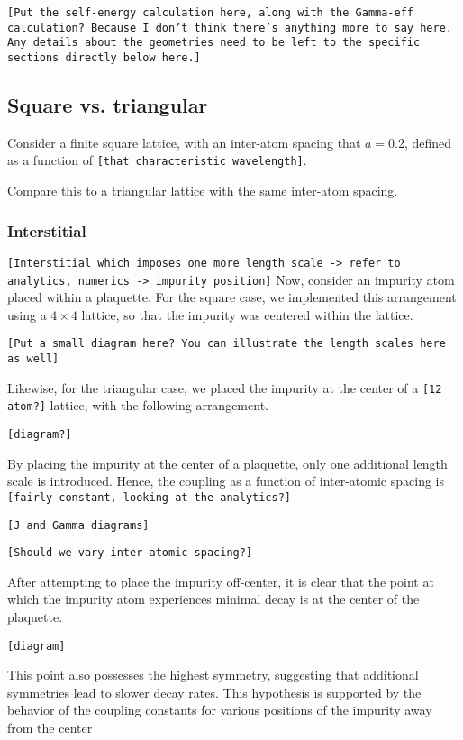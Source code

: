 \documentclass[aps,pra,superscriptaddress,twocolumn]{revtex4-1}
\newcommand{\commentSB}[1]{\texttt{\color{blue}[#1]}}
\newcommand{\commentSO}[1]{\texttt{\color{orange}[#1]}}
\begin{document}
\commentSB{Put the self-energy calculation here, along with the Gamma-eff calculation? Because I don't think there's anything more to say here. Any details about the geometries need to be left to the specific sections directly below here.}

\subsection{Square vs. triangular}

Consider a finite square lattice, with an inter-atom spacing that $a = 0.2$, defined as a function of \commentSB{that characteristic wavelength}. 

Compare this to a triangular lattice with the same inter-atom spacing. 

\subsubsection{Interstitial}
\commentSO{Interstitial which imposes one more length scale -> refer to analytics, numerics -> impurity position}
Now, consider an impurity atom placed within a plaquette. For the square case, we implemented this arrangement using a $4\times 4$ lattice, so that the impurity was centered within the lattice. 

\commentSB{Put a small diagram here? You can illustrate the length scales here as well}

Likewise, for the triangular case, we placed the impurity at the center of a \commentSB{12 atom?} lattice, with the following arrangement. 

\commentSB{diagram?}

By placing the impurity at the center of a plaquette, only one additional length scale is introduced. Hence, the coupling as a function of inter-atomic spacing is \commentSB{fairly constant, looking at the analytics?} 

\commentSB{J and Gamma diagrams}

\commentSB{Should we vary inter-atomic spacing?}

After attempting to place the impurity off-center, it is clear that the point at which the impurity atom experiences minimal decay is at the center of the plaquette. 

\commentSB{diagram}

This point also possesses the highest symmetry, suggesting that additional symmetries lead to slower decay rates. This hypothesis is supported by the behavior of the coupling constants for various positions of the impurity away from the center 
\end{document}

